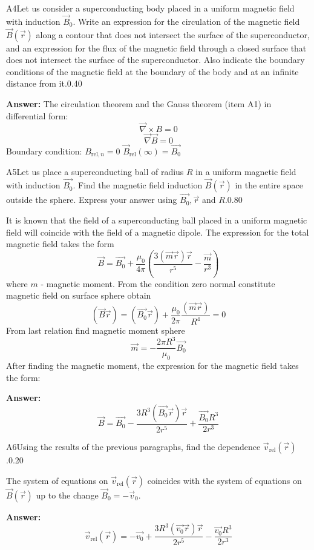 \documentclass[11pt,a4paper]{article}
\begin{document}
\begin{solcard}{A4}{Let us consider a superconducting body placed in a uniform magnetic field with induction $\vec{B}_0$. Write an expression for the circulation of the magnetic field $\vec{B}(\vec{r})$ along a contour that does not intersect the surface of the superconductor, and an expression for the flux of the magnetic field through a closed surface that does not intersect the surface of the superconductor. Also indicate the boundary conditions of the magnetic field at the boundary of the body and at an infinite distance from it.}{0.40}
\par\smallskip\noindent\textbf{Answer:} The circulation theorem and the Gauss theorem (item A1) in differential form: $$\vec{\nabla} \times  B = 0$$$$\vec{\nabla} \vec{B}  = 0$$Boundary condition: $B_{\text{rel},n} = 0$ $\vec{B}_{\text{rel}} (\infty) = \vec{B_0}$
\end{solcard}

\begin{solcard}{A5}{Let us place a superconducting ball of radius $R$ in a uniform magnetic field with induction $\vec{B_0}$. Find the magnetic field induction $\vec{B}(\vec{r})$ in the entire space outside the sphere. Express your answer using $\vec{B_0}, \vec{r}$ and $R$.}{0.80}

It is known that the field of a superconducting ball placed in a uniform magnetic field will coincide with the field of a magnetic dipole. The expression for the total magnetic field takes the form $$\vec{B}=\vec{B_0}+\frac{\mu_0}{4\pi}\left(\frac{3(\vec{m}\vec{r})\vec{r}}{r^5}-\frac{\vec{m}}{r^3}\right) $$where $m$ - magnetic moment. From the condition zero normal constitute magnetic field on surface sphere obtain $$(\vec{B}\vec{r})=(\vec{B_0}\vec{r})+\frac{\mu_0}{2\pi}\frac{(\vec{m}\vec{r})}{R^4}=0 $$From last relation find magnetic moment sphere $$\vec{m}=-\frac{2\pi R^3}{\mu_0}\vec{B_0} $$After finding the magnetic moment, the expression for the magnetic field takes the form:

\par\smallskip\noindent\textbf{Answer:} $$\vec{B}=\vec{B_0}-\frac{3R^3(\vec{B_0}\vec{r})\vec{r}}{2r^5}+\frac{\vec{B_0}R^3}{2r^3} $$
\end{solcard}

\begin{solcard}{A6}{Using the results of the previous paragraphs, find the dependence $\vec{v}_{\text{rel}}(\vec{r})$.}{0.20}

The system of equations on $\vec{v}_{\text{rel}}(\vec{r})$ coincides with the system of equations on $\vec{B}(\vec{r})$ up to the change $\vec{B}_0 = -\vec{v}_0$.

\par\smallskip\noindent\textbf{Answer:} $$\vec{v}_{\text{rel}}(\vec{r}) = -\vec{v_0}+\frac{3R^3(\vec{v_0}\vec{r})\vec{r}}{2r^5}-\frac{\vec{v_0}R^3}{2r^3} $$
\end{solcard}
\end{document}
